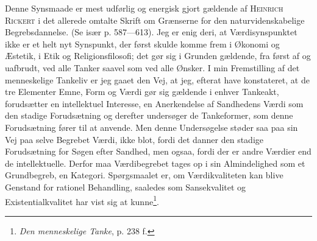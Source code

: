 \documentclass[12pt]{article}
\begin{document}
Denne Synsmaade er mest udførlig og energisk gjort gældende af \textsc{Heinrich
Rickert} i det allerede omtalte Skrift om Grænserne for den naturvidenskabelige
Begrebsdannelse. (Se især p. 587---613). Jeg er enig deri, at Værdisynspunktet
ikke er et helt nyt Synspunkt, der først skulde komme frem i Økonomi og Æstetik,
i Etik og Religionsfilosofi; det gør sig i Grunden gældende, fra først af og
uafbrudt, ved alle Tanker saavel som ved alle Ønsker. I min Fremstilling af det
menneskelige Tankeliv er jeg gaaet den Vej, at jeg, efterat have konstateret, at
de tre Elementer Emne, Form og Værdi gør sig gældende i enhver Tankeakt,
forudsætter en intellektuel Interesse, en Anerkendelse af Sandhedens Værdi som
den stadige Forudsætning og derefter undersøger de Tankeformer, som denne
Forudsætning fører til at anvende. Men denne Undersøgelse støder saa paa sin Vej
paa selve Begrebet Værdi, ikke blot, fordi det danner den stadige Forudsætning
for Søgen efter Sandhed, men ogsaa, fordi der er andre Værdier end de
intellektuelle. Derfor maa Værdibegrebet tages op i sin Almindelighed som et
Grundbegreb, en Kategori. Spørgsmaalet er, om Værdikvaliteten kan blive Genstand
for rationel Behandling, saaledes som Sansekvalitet og Existentialkvalitet har
vist sig at kunne\footnote{\textit{Den menneskelige Tanke}, p. 238 f.}.
\end{document}
